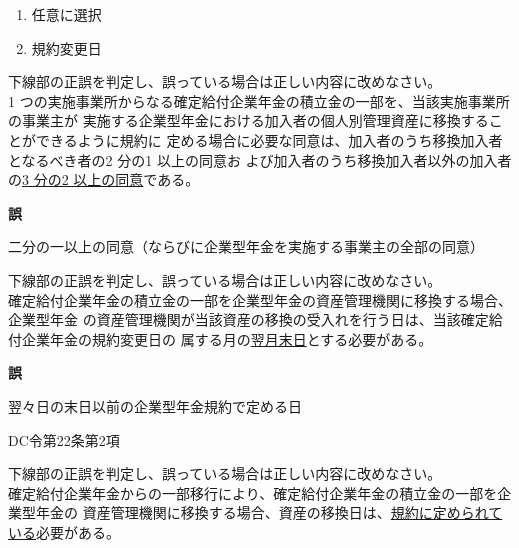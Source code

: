 \begin{answerbox}
  \begin{enumerate}[A: ]
    \item 任意に選択
    \item 規約変更日
  \end{enumerate}
\end{answerbox}

\begin{truefalse}[年金1 2019 問題1(2)\textcircled{2}]
  下線部の正誤を判定し、誤っている場合は正しい内容に改めなさい。
\\

  1 つの実施事業所からなる確定給付企業年金の積立金の一部を、当該実施事業所の事業主が
実施する企業型年金における加入者の個人別管理資産に移換することができるように規約に
定める場合に必要な同意は、加入者のうち移換加入者となるべき者の2 分の1 以上の同意お
よび加入者のうち移換加入者以外の加入者の\underline{3 分の2 以上の同意}である。
\end{truefalse}

\begin{answerbox}
  \textbf{誤}

  二分の一以上の同意（ならびに企業型年金を実施する事業主の全部の同意）
\end{answerbox}

\begin{truefalse}[年金1 2018 問題1(2)\textcircled{4}]
  下線部の正誤を判定し、誤っている場合は正しい内容に改めなさい。
\\

確定給付企業年金の積立金の一部を企業型年金の資産管理機関に移換する場合、企業型年金
の資産管理機関が当該資産の移換の受入れを行う日は、当該確定給付企業年金の規約変更日の
属する月の\underline{翌月末日}とする必要がある。
\end{truefalse}

\begin{answerbox}
  \textbf{誤}

  翌々日の末日以前の企業型年金規約で定める日
\end{answerbox}

\begin{explanationbox}
  DC令第22条第2項
\end{explanationbox}

\begin{truefalse}[年金1 H28 問題1(4)\textcircled{3}]
  下線部の正誤を判定し、誤っている場合は正しい内容に改めなさい。
\\

確定給付企業年金からの一部移行により、確定給付企業年金の積立金の一部を企業型年金の
資産管理機関に移換する場合、資産の移換日は、\underline{規約に定められている}必要がある。
\end{truefalse}

